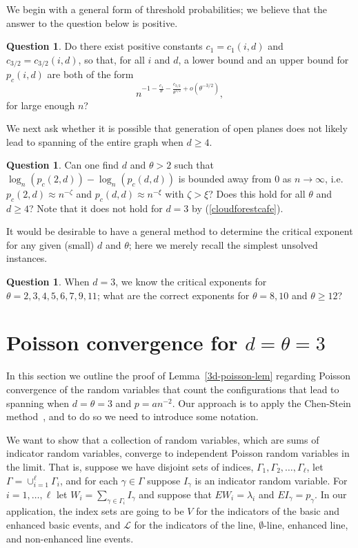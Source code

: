 \documentclass{amsart}
\newcommand{\threshold}{\theta}
\numberwithin{equation}{section}
\newcommand{\lineset}{\mathscr{L}}
\theoremstyle{definition}
\newtheorem{question}[theorem]{Question}
\theoremstyle{remark}
\begin{document}
We begin with a general form of threshold probabilities; we believe that the answer to the question 
below is positive.

\begin{question} Do there exist positive constants  $c_1=c_1(i,d)$ and $c_{3/2}=c_{3/2}(i,d)$, so that, for
all $i$ and $d$, a lower bound and an upper bound for $p_c(i,d)$ are both  of the form 
$$n^{-1 - \frac{c_1}{\threshold} - \frac{c_{3/2}}{\threshold^{3/2}}+o(\threshold^{-3/2})},$$
for large enough $n$?
\end{question}

We next ask whether it is possible that generation of open planes  
does not likely lead to spanning of the entire graph when $d\geq 4$.

\begin{question}
Can one find $d$ and $\theta>2$ such that $\log_n(p_c(2,d))-\log_n(p_c(d,d))$ is bounded away from 0 as $n \to \infty$, i.e. $p_c(2,d)\approx n^{-\zeta}$ and $p_c(d,d)\approx n^{-\xi}$
with $\zeta>\xi$? Does this hold for all $\theta$ and $d \geq 4$? Note that it does not hold for $d=3$ by (\ref{cloudforestcafe}).
\end{question}

It would be desirable to have a general method to determine the critical exponent for any given 
(small) $d$ and $\threshold$;
here we merely recall the simplest unsolved instances. 


\begin{question}
When $d=3$, we know the critical exponents for $\theta = 2,3,4,5,6,7,9,11$;  
what are the correct exponents for $\theta = 8, 10$ and $\theta \geq 12$?
\end{question}

\appendix
\section{Poisson convergence for $d=\threshold=3$}
\label{ap:poisson}
In this section we outline the proof of Lemma~\ref{3d-poisson-lem} regarding Poisson convergence of the random variables that count the configurations that lead to spanning when $d=\threshold=3$ and $p = an^{-2}$.  Our approach is to apply the Chen-Stein method~\cite{poissonbook}, and to do so we need to introduce some notation.

We want to show that a collection of random variables, which are sums of indicator random variables, converge to independent Poisson random variables in the limit.  That is, suppose we have disjoint sets of indices, $\Gamma_1, \Gamma_2, \ldots, \Gamma_\ell$, let $\Gamma = \cup_{i=1}^\ell \Gamma_i$, and for each $\gamma \in \Gamma$ suppose $I_\gamma$ is an indicator random variable.  For $i=1, \ldots, \ell$ let $W_i = \sum_{\gamma\in \Gamma_i} I_\gamma$ and suppose that $EW_i = \lambda_i$ and $EI_\gamma = p_\gamma$.  In our application, the index sets are going to be $V$ for the indicators of the basic and enhanced basic events, and $\lineset$ for the indicators of the line, $\emptyset$-line, enhanced line, and non-enhanced line events.
\end{document}
